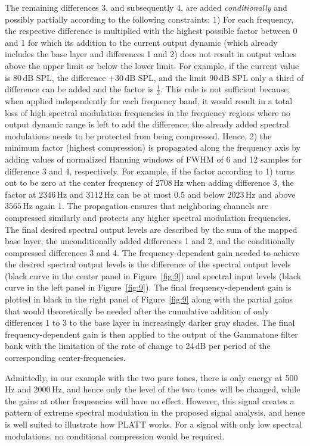 \documentclass[10pt,a4paper,twocolumn]{article}
\begin{document}
The remaining differences 3, and subsequently 4, are added \emph{conditionally} and possibly partially according to the following constraints:
%
1) For each frequency, the respective difference is multiplied with the highest possible factor between 0 and 1 for which its addition to the current output dynamic (which already includes the base layer and differences 1 and 2) does not result in output values above the upper limit or below the lower limit.
%
For example, if the current value is $80\,\text{dB~SPL}$, the difference $+30\,\text{dB~SPL}$, and the limit $90\,\text{dB~SPL}$ only a third of difference can be added and the factor is $\frac{1}{3}$.
%
This rule is not sufficient because, when applied independently for each frequency band, it would result in a total loss of high spectral modulation frequencies in the frequency regions where no output dynamic range is left to add the difference; the already added spectral modulations needs to be protected from being compressed.
%
Hence, 2) the minimum factor (highest compression) is propagated along the frequency axis by adding values of normalized Hanning windows of FWHM of 6 and 12 samples for difference 3 and 4, respectively.
%
For example, if the factor according to 1) turns out to be zero at the center frequency of $2708\,\text{Hz}$ when adding difference 3, the factor at $2346\,\text{Hz}$ and $3112\,\text{Hz}$ can be at most $0.5$ and below $2023\,\text{Hz}$ and above $3565\,\text{Hz}$ again 1.
%
The propagation ensures that neighboring channels are compressed similarly and protects any higher spectral modulation frequencies.
%
The final desired spectral output levels are described by the sum of the mapped base layer, the unconditionally added differences 1 and 2, and the conditionally compressed differences 3 and 4.
%
The frequency-dependent gain needed to achieve the desired spectral output levels is the difference of the spectral output levels (black curve in the center panel in Figure~\ref{fig:9}) and spectral input levels (black curve in the left panel in Figure~\ref{fig:9}).
%
The final frequency-dependent gain is plotted in black in the right panel of Figure~\ref{fig:9} along with the partial gains that would theoretically be needed after the cumulative addition of only differences 1 to 3 to the base layer in increasingly darker gray shades.
%
The final frequency-dependent gain is then applied to the output of the Gammatone filter bank with the limitation of the rate of change to 24\,dB per period of the corresponding center-frequencies.

Admittedly, in our example with the two pure tones, there is only energy at 500\,Hz and 2000\,Hz, and hence only the level of the two tones will be changed, while the gains at other frequencies will have no effect.
%
However, this signal creates a pattern of extreme spectral modulation in the proposed signal analysis, and hence is well suited to illustrate how PLATT works.
%
For a signal with only low spectral modulations, no conditional compression would be required.
\end{document}
